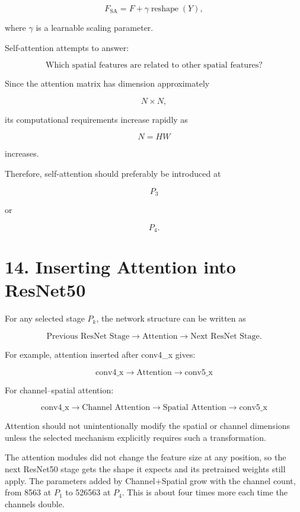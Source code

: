 \documentclass[10pt]{article}
\begin{document}
\[
F_{\mathrm{SA}}
=
F
+
\gamma
\operatorname{reshape}(Y),
\]

where $\gamma$ is a learnable scaling parameter.

Self-attention attempts to answer:

\[
\boxed{
\text{Which spatial features are related to other spatial features?}
}
\]

Since the attention matrix has dimension approximately

\[
N\times N,
\]

its computational requirements increase rapidly as

\[
N=HW
\]

increases.

Therefore, self-attention should preferably be introduced at

\[
P_3
\]

or

\[
P_4.
\]

\section*{14. Inserting Attention into ResNet50}

For any selected stage $P_k$, the network structure can be written as

\[
\text{Previous ResNet Stage}
\rightarrow
\text{Attention}
\rightarrow
\text{Next ResNet Stage}.
\]

For example, attention inserted after conv4\_x gives:

\[
\boxed{
\text{conv4\_x}
\rightarrow
\text{Attention}
\rightarrow
\text{conv5\_x}
}
\]

For channel--spatial attention:

\[
\boxed{
\text{conv4\_x}
\rightarrow
\text{Channel Attention}
\rightarrow
\text{Spatial Attention}
\rightarrow
\text{conv5\_x}
}
\]

Attention should not unintentionally modify the spatial or channel
dimensions unless the selected mechanism explicitly requires such a
transformation.

The attention modules did not change the feature size at any position, so the next ResNet50 stage gets the shape it expects and its pretrained weights still apply. The parameters added by Channel+Spatial grow with the channel count, from 8563 at $P_1$ to 526563 at $P_4$. This is about four times more each time the channels double.
\end{document}
